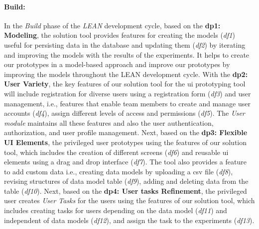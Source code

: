 \paragraph{Build:}
In the \textit{Build} phase of the \textit{LEAN} development cycle, based on the \textbf{\ac{dp}1: Modeling}, the solution tool provides features for creating the models (\textit{\ac{df}1}) useful for persisting data in the database and updating them (\textit{\ac{df}2}) by iterating and improving the models with the results of the experiments.
It helps to create our prototypes in a model-based approach and improve our prototypes by improving the models throughout the LEAN development cycle.
With the \textbf{\ac{dp}2: User Variety}, the key features of our solution tool for the \ac{ui} prototyping tool will include registration for diverse users using a registration form (\textit{\ac{df}3}) and user management, i.e., features that enable team members to create and manage user accounts (\textit{\ac{df}4}), assign different levels of access and permissions (\textit{\ac{df}5}).
The \textit{User module} maintains all these features and also the user authentication, authorization, and user profile management.
Next, based on the \textbf{\ac{dp}3: Flexible UI Elements}, the privileged user prototypes using the features of our solution tool, which includes the creation of different screens (\textit{\ac{df}6}) and reusable \ac{ui} elements using a drag and drop interface (\textit{\ac{df}7}). 
The tool also provides a feature to add custom data i.e., creating data models by uploading a \ac{csv} file (\textit{\ac{df}8}), revising structures of data model table (\textit{\ac{df}9}), adding and deleting data from the table (\textit{\ac{df}10}).
Next, based on the \textbf{\ac{dp}4: User tasks Refinement}, the privileged user creates \textit{User Tasks} for the users using the features of our solution tool, which includes creating tasks for users depending on the data model (\textit{\ac{df}11}) and independent of data models (\textit{\ac{df}12}), and assign the task to the experiments (\textit{\ac{df}13}).

